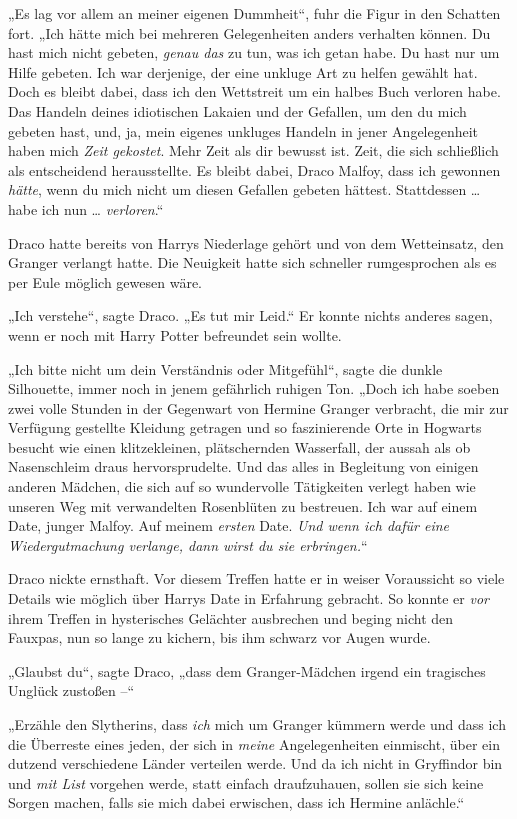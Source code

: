{„Es lag vor allem an meiner eigenen Dummheit“, fuhr die Figur in den Schatten fort. „Ich hätte mich bei mehreren Gelegenheiten anders verhalten können. Du hast mich nicht gebeten, \emph{genau das} zu tun, was ich getan habe. Du hast nur um Hilfe gebeten. Ich war derjenige, der eine unkluge Art zu helfen gewählt hat. Doch es bleibt dabei, dass ich den Wettstreit um ein halbes Buch verloren habe. Das Handeln deines idiotischen Lakaien und der Gefallen, um den du mich gebeten hast, und, ja, mein eigenes unkluges Handeln in jener Angelegenheit haben mich \emph{Zeit gekostet}. Mehr Zeit als dir bewusst ist. Zeit, die sich schließlich als entscheidend herausstellte. Es bleibt dabei, Draco Malfoy, dass ich gewonnen \emph{hätte}, wenn du mich nicht um diesen Gefallen gebeten hättest. Stattdessen … habe ich nun … \emph{verloren}.“

Draco hatte bereits von Harrys Niederlage gehört und von dem Wetteinsatz, den Granger verlangt hatte. Die Neuigkeit hatte sich schneller rumgesprochen als es per Eule möglich gewesen wäre.

„Ich verstehe“, sagte Draco. „Es tut mir Leid.“ Er konnte nichts anderes sagen, wenn er noch mit Harry Potter befreundet sein wollte.

„Ich bitte nicht um dein Verständnis oder Mitgefühl“, sagte die dunkle Silhouette, immer noch in jenem gefährlich ruhigen Ton. „Doch ich habe soeben zwei volle Stunden in der Gegenwart von Hermine Granger verbracht, die mir zur Verfügung gestellte Kleidung getragen und so faszinierende Orte in Hogwarts besucht wie einen klitzekleinen, plätschernden Wasserfall, der aussah als ob Nasenschleim draus hervorsprudelte. Und das alles in Begleitung von einigen anderen Mädchen, die sich auf so wundervolle Tätigkeiten verlegt haben wie unseren Weg mit verwandelten Rosenblüten zu bestreuen. Ich war auf einem Date, junger Malfoy. Auf meinem \emph{ersten} Date. \emph{Und wenn ich dafür eine Wiedergutmachung verlange, dann wirst du sie erbringen.}“

Draco nickte ernsthaft. Vor diesem Treffen hatte er in weiser Voraussicht so viele Details wie möglich über Harrys Date in Erfahrung gebracht. So konnte er \emph{vor} ihrem Treffen in hysterisches Gelächter ausbrechen und beging nicht den Fauxpas, nun so lange zu kichern, bis ihm schwarz vor Augen wurde.

„Glaubst du“, sagte Draco, „dass dem Granger-Mädchen irgend ein tragisches Unglück zustoßen --“

„Erzähle den Slytherins, dass \emph{ich} mich um Granger kümmern werde und dass ich die Überreste eines jeden, der sich in \emph{meine} Angelegenheiten einmischt, über ein dutzend verschiedene Länder verteilen werde. Und da ich nicht in Gryffindor bin und \emph{mit List} vorgehen werde, statt einfach draufzuhauen, sollen sie sich keine Sorgen machen, falls sie mich dabei erwischen, dass ich Hermine anlächle.“

}
